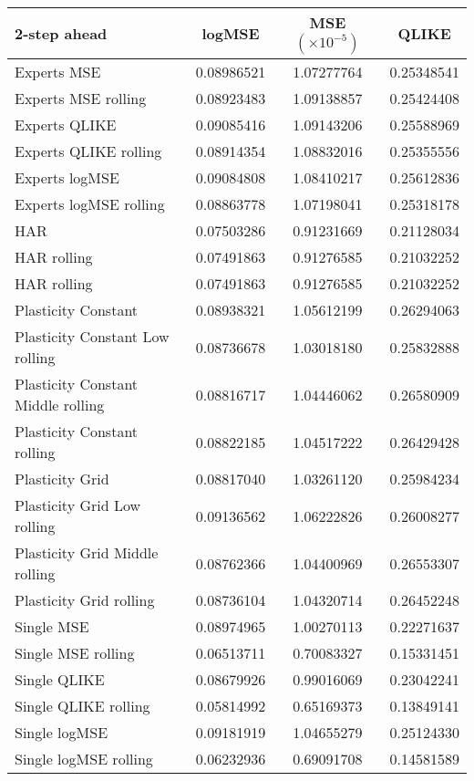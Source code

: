 
\begin{tabular}{l|c|c|c}
2-step ahead     & logMSE & MSE $(\times 10^{-5})$ & QLIKE \\\hline
Experts MSE & 0.08986521 & 1.07277764 & 0.25348541\\ 
Experts MSE rolling & 0.08923483 & 1.09138857 & 0.25424408\\ 
Experts QLIKE & 0.09085416 & 1.09143206 & 0.25588969\\ 
Experts QLIKE rolling & 0.08914354 & 1.08832016 & 0.25355556\\ 
Experts logMSE & 0.09084808 & 1.08410217 & 0.25612836\\ 
Experts logMSE rolling & 0.08863778 & 1.07198041 & 0.25318178\\ 
HAR & 0.07503286 & 0.91231669 & 0.21128034\\ 
HAR rolling & 0.07491863 & 0.91276585 & 0.21032252\\ 
HAR rolling & 0.07491863 & 0.91276585 & 0.21032252\\ 
Plasticity Constant & 0.08938321 & 1.05612199 & 0.26294063\\ 
Plasticity Constant Low rolling & 0.08736678 & 1.03018180 & 0.25832888\\ 
Plasticity Constant Middle rolling & 0.08816717 & 1.04446062 & 0.26580909\\ 
Plasticity Constant rolling & 0.08822185 & 1.04517222 & 0.26429428\\ 
Plasticity Grid & 0.08817040 & 1.03261120 & 0.25984234\\ 
Plasticity Grid Low rolling & 0.09136562 & 1.06222826 & 0.26008277\\ 
Plasticity Grid Middle rolling & 0.08762366 & 1.04400969 & 0.26553307\\ 
Plasticity Grid rolling & 0.08736104 & 1.04320714 & 0.26452248\\ 
Single MSE & 0.08974965 & 1.00270113 & 0.22271637\\ 
Single MSE rolling & 0.06513711 & 0.70083327 & 0.15331451\\ 
Single QLIKE & 0.08679926 & 0.99016069 & 0.23042241\\ 
Single QLIKE rolling & 0.05814992 & 0.65169373 & 0.13849141\\ 
Single logMSE & 0.09181919 & 1.04655279 & 0.25124330\\ 
Single logMSE rolling & 0.06232936 & 0.69091708 & 0.14581589\\ 
\end{tabular}